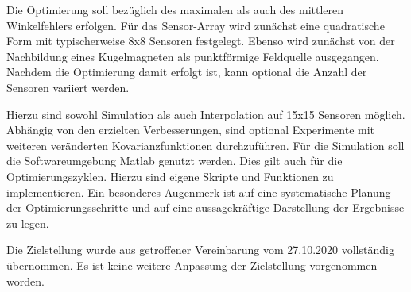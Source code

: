 Die Optimierung soll bezüglich des maximalen als auch des mittleren Winkelfehlers erfolgen. Für das
Sensor-Array wird zunächst eine quadratische Form mit typischerweise 8x8 Sensoren festgelegt. Ebenso
wird zunächst von der Nachbildung eines Kugelmagneten als punktförmige Feldquelle ausgegangen.
Nachdem die Optimierung damit erfolgt ist, kann optional die Anzahl der Sensoren variiert werden.


\clearpage


Hierzu sind sowohl Simulation als auch Interpolation auf 15x15 Sensoren möglich. Abhängig von den
erzielten Verbesserungen, sind optional Experimente mit weiteren veränderten Kovarianzfunktionen
durchzuführen.
Für die Simulation soll die Softwareumgebung Matlab genutzt werden. Dies gilt auch für die Optimierungszyklen. Hierzu sind eigene Skripte und Funktionen zu implementieren. Ein besonderes Augenmerk
ist auf eine systematische Planung der Optimierungsschritte und auf eine aussagekräftige Darstellung
der Ergebnisse zu legen.

Die Zielstellung wurde aus getroffener Vereinbarung vom 27.10.2020 vollständig übernommen. Es ist keine weitere Anpassung der Zielstellung vorgenommen worden.

